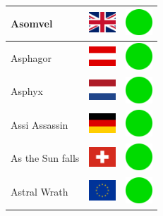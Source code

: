 \documentclass[12pt, a4paper, twoside]{report}
\begin{document}
\begin{center}
\begin{longtable}{|p{5cm}|p{2cm}|p{2cm}|}
 Asomvel                                                    & \includegraphics[width=1cm]{../img/flags/gb} &   \includegraphics[width=1cm]{../likes/y} \\ \hline
 Asphagor                                                   & \includegraphics[width=1cm]{../img/flags/at} &   \includegraphics[width=1cm]{../likes/y} \\ \hline
 Asphyx                                                     & \includegraphics[width=1cm]{../img/flags/nl} &   \includegraphics[width=1cm]{../likes/y} \\ \hline
 Assi Assassin                                              & \includegraphics[width=1cm]{../img/flags/de} &   \includegraphics[width=1cm]{../likes/y} \\ \hline
 As the Sun falls                                           & \includegraphics[width=1cm]{../img/flags/ch} &   \includegraphics[width=1cm]{../likes/y} \\ \hline
 Astral Wrath                                               & \includegraphics[width=1cm]{../img/flags/eu} &   \includegraphics[width=1cm]{../likes/y} \\ \hline

\end{longtable}
\end{center}
\end{document}
